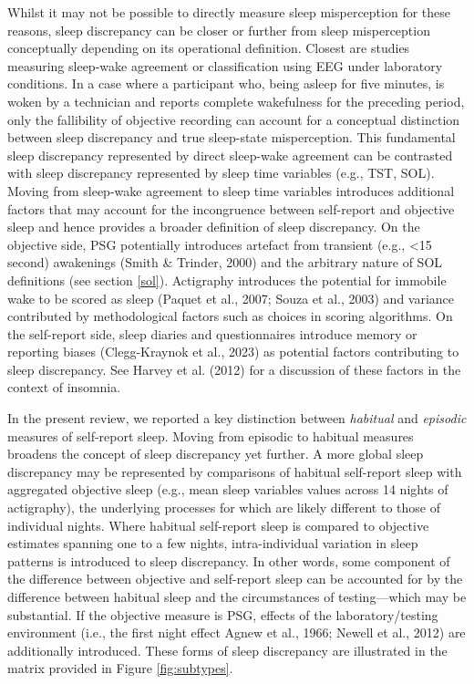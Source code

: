 \documentclass[
]{article}
\begin{document}
Whilst it may not be possible to directly measure sleep misperception for these reasons, sleep discrepancy can be closer or further from sleep misperception conceptually depending on its operational definition. Closest are studies measuring sleep-wake agreement or classification using EEG under laboratory conditions. In a case where a participant who, being asleep for five minutes, is woken by a technician and reports complete wakefulness for the preceding period, only the fallibility of objective recording can account for a conceptual distinction between sleep discrepancy and true sleep-state misperception. This fundamental sleep discrepancy represented by direct sleep-wake agreement can be contrasted with sleep discrepancy represented by sleep time variables (e.g., TST, SOL). Moving from sleep-wake agreement to sleep time variables introduces additional factors that may account for the incongruence between self-report and objective sleep and hence provides a broader definition of sleep discrepancy. On the objective side, PSG potentially introduces artefact from transient (e.g., \textless15 second) awakenings (Smith \& Trinder, 2000) and the arbitrary nature of SOL definitions (see section \ref{sol}). Actigraphy introduces the potential for immobile wake to be scored as sleep (Paquet et al., 2007; Souza et al., 2003) and variance contributed by methodological factors such as choices in scoring algorithms. On the self-report side, sleep diaries and questionnaires introduce memory or reporting biases (Clegg-Kraynok et al., 2023) as potential factors contributing to sleep discrepancy. See Harvey et al. (2012) for a discussion of these factors in the context of insomnia.

In the present review, we reported a key distinction between \emph{habitual} and \emph{episodic} measures of self-report sleep. Moving from episodic to habitual measures broadens the concept of sleep discrepancy yet further. A more global sleep discrepancy may be represented by comparisons of habitual self-report sleep with aggregated objective sleep (e.g., mean sleep variables values across 14 nights of actigraphy), the underlying processes for which are likely different to those of individual nights. Where habitual self-report sleep is compared to objective estimates spanning one to a few nights, intra-individual variation in sleep patterns is introduced to sleep discrepancy. In other words, some component of the difference between objective and self-report sleep can be accounted for by the difference between habitual sleep and the circumstances of testing---which may be substantial. If the objective measure is PSG, effects of the laboratory/testing environment (i.e., the first night effect Agnew et al., 1966; Newell et al., 2012) are additionally introduced. These forms of sleep discrepancy are illustrated in the matrix provided in Figure \ref{fig:subtypes}.
\end{document}
